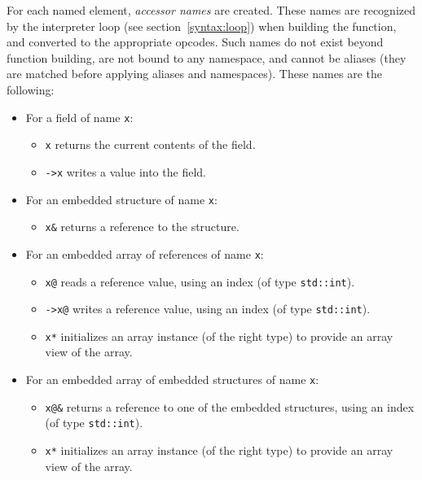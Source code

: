 For each named element, \emph{accessor names} are created. These names
are recognized by the interpreter loop (see section~\ref{syntax:loop})
when building the function, and converted to the appropriate opcodes.
Such names do not exist beyond function building, are not bound to any
namespace, and cannot be aliases (they are matched before applying
aliases and namespaces). These names are the following:
\begin{itemize}

    \item For a field of name \verb|x|:
    \begin{itemize}

        \item \verb|x| returns the current contents of the field.

        \item \verb|->x| writes a value into the field.

    \end{itemize}

    \item For an embedded structure of name \verb|x|:
    \begin{itemize}

        \item \verb|x&| returns a reference to the structure.

    \end{itemize}

    \item For an embedded array of references of name \verb|x|:
    \begin{itemize}

        \item \verb|x@| reads a reference value, using an index (of type
        \verb|std::int|).

        \item \verb|->x@| writes a reference value, using an index (of type
        \verb|std::int|).

        \item \verb|x*| initializes an array instance (of the right type)
        to provide an array view of the array.

    \end{itemize}

    \item For an embedded array of embedded structures of name \verb|x|:
    \begin{itemize}

        \item \verb|x@&| returns a reference to one of the embedded
        structures, using an index (of type \verb|std::int|).

        \item \verb|x*| initializes an array instance (of the right type)
        to provide an array view of the array.

    \end{itemize}

\end{itemize}

